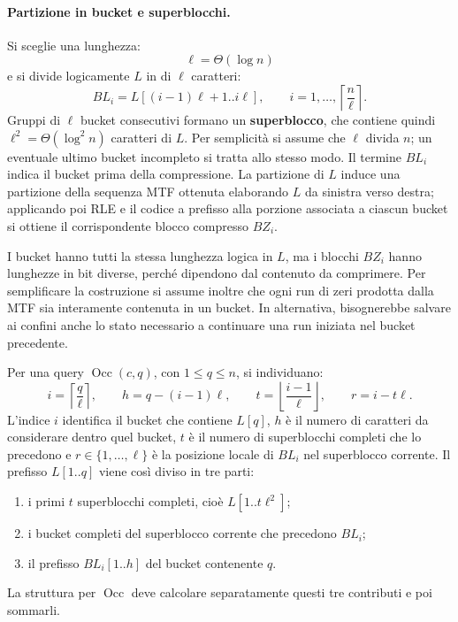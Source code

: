 \documentclass{article}
\theoremstyle{definition}
\numberwithin{equation}{section}
\begin{document}
\paragraph{Partizione in bucket e superblocchi.}
Si sceglie una lunghezza:
\[
    \ell=\Theta(\log n)
\]
e si divide logicamente $L$ in \textbf{} di $\ell$ caratteri:
\[
    BL_i
    =
    L[(i-1)\ell+1..i\ell],
    \qquad
    i=1,\ldots,\left\lceil\frac{n}{\ell}\right\rceil.
\]
Gruppi di $\ell$ bucket consecutivi formano un \textbf{superblocco}, che contiene quindi $\ell^2=\Theta(\log^2 n)$ caratteri di $L$. Per semplicità si assume che $\ell$ divida $n$; un eventuale ultimo bucket incompleto si tratta allo stesso modo. Il termine $BL_i$ indica il bucket prima della compressione. La partizione di $L$ induce una partizione della sequenza MTF ottenuta elaborando $L$ da sinistra verso destra; applicando poi RLE e il codice a prefisso alla porzione associata a ciascun bucket si ottiene il corrispondente blocco compresso $BZ_i$.

I bucket hanno tutti la stessa lunghezza logica in $L$, ma i blocchi $BZ_i$ hanno lunghezze in bit diverse, perché dipendono dal contenuto da comprimere. Per semplificare la costruzione si assume inoltre che ogni run di zeri prodotta dalla MTF sia interamente contenuta in un bucket. In alternativa, bisognerebbe salvare ai confini anche lo stato necessario a continuare una run iniziata nel bucket precedente.

Per una query $\operatorname{Occ}(c,q)$, con $1\leq q\leq n$, si individuano:
\[
    i=\left\lceil\frac{q}{\ell}\right\rceil,
    \qquad
    h=q-(i-1)\ell,
    \qquad
    t=\left\lfloor\frac{i-1}{\ell}\right\rfloor,
    \qquad
    r=i-t\ell.
\]
L'indice $i$ identifica il bucket che contiene $L[q]$, $h$ è il numero di caratteri da considerare dentro quel bucket, $t$ è il numero di superblocchi completi che lo precedono e $r\in\{1,\ldots,\ell\}$ è la posizione locale di $BL_i$ nel superblocco corrente. Il prefisso $L[1..q]$ viene così diviso in tre parti:
\begin{enumerate}
    \item i primi $t$ superblocchi completi, cioè $L[1..t\ell^2]$;
    \item i bucket completi del superblocco corrente che precedono $BL_i$;
    \item il prefisso $BL_i[1..h]$ del bucket contenente $q$.
\end{enumerate}
La struttura per $\operatorname{Occ}$ deve calcolare separatamente questi tre contributi e poi sommarli.
\end{document}
